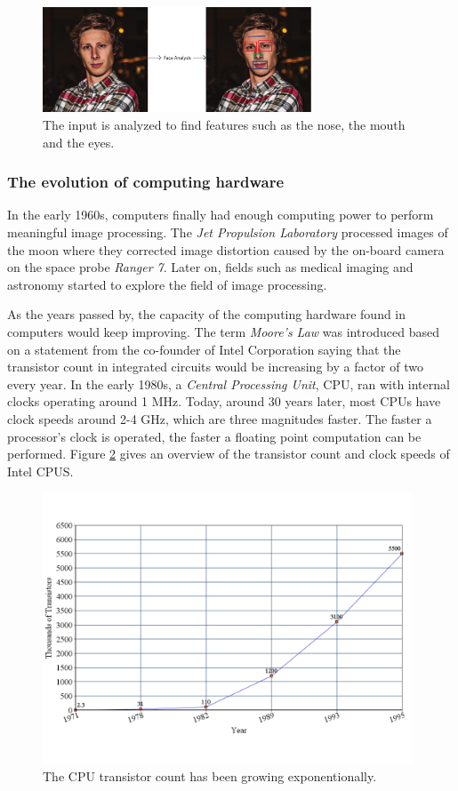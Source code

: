 \begin{figure}[ht!]
\centering
\includegraphics[width=80mm]{img/feature.pdf}
\caption{The input is analyzed to find features such as the nose, the mouth and the eyes.}
\label{feature}
\end{figure}

\subsubsection{The evolution of computing hardware}

In the early 1960s, computers finally had enough computing power to perform meaningful image processing. The \emph{Jet Propulsion Laboratory} processed images of the moon where they corrected image distortion caused by the on-board camera on the space probe \emph{Ranger 7}\cite{ipbook}. Later on, fields such as medical imaging and astronomy started to explore the field of image processing. 
\newline

As the years passed by, the capacity of the computing hardware found in computers would keep improving. The term \emph{Moore's Law}\cite{mooreslaw} was introduced based on a statement from the co-founder of Intel Corporation saying that the transistor count in integrated circuits would be increasing by a factor of two every year. In the early 1980s, a \emph{Central Processing Unit}, CPU, ran with internal clocks operating around 1 MHz. Today, around 30 years later, most CPUs have clock speeds around 2-4 GHz, which are three magnitudes faster. The faster a processor's clock is operated, the faster a floating point computation can be performed. Figure \ref{intelcpu} gives an overview of the transistor count and clock speeds of Intel CPUS\cite{mooreslawdata}.
\newline
\begin{figure}[ht!]
\centering
\includegraphics[width=110mm]{img/cpu.png}
\caption{The CPU transistor count has been growing exponentionally.}
\label{intelcpu}
\end{figure}


